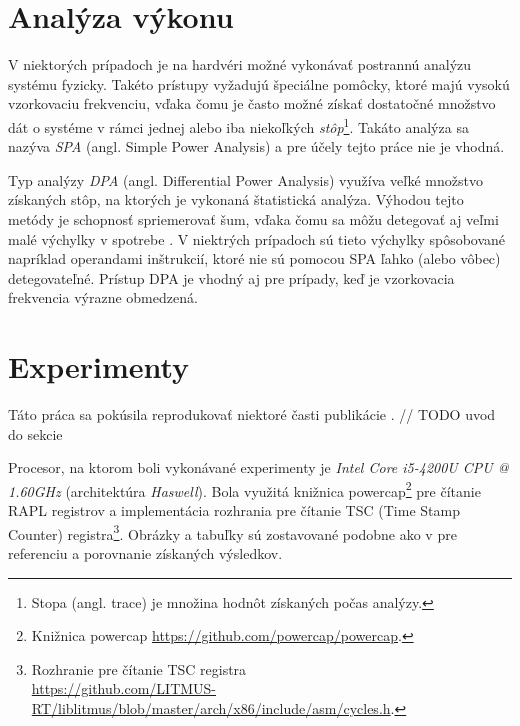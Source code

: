 \section{Analýza výkonu}
V niektorých prípadoch je na hardvéri možné vykonávať postrannú analýzu systému fyzicky. Takéto prístupy vyžadujú špeciálne pomôcky,
ktoré majú vysokú vzorkovaciu frekvenciu, vďaka čomu je často možné získať dostatočné množstvo dát o systéme v rámci jednej alebo
iba niekoľkých \emph{stôp}\footnote{Stopa (angl. trace) je množina hodnôt získaných počas analýzy.}.
Takáto analýza sa nazýva \emph{SPA} (angl. Simple Power Analysis) a pre účely tejto práce nie je vhodná.

Typ analýzy \emph{DPA} (angl. Differential Power Analysis) využíva veľké množstvo získaných stôp, na ktorých je vykonaná štatistická analýza.
Výhodou tejto metódy je schopnosť spriemerovať šum, vďaka čomu sa môžu detegovať aj veľmi malé výchylky v spotrebe \cite{Platypus}. V niektrých prípadoch sú tieto
výchylky spôsobované napríklad operandami inštrukcií, ktoré nie sú pomocou SPA ľahko (alebo vôbec) detegovateľné. Prístup DPA je vhodný aj pre
prípady, keď je vzorkovacia frekvencia výrazne obmedzená.

\section{Experimenty}
Táto práca sa pokúsila reprodukovať niektoré časti publikácie \cite{Platypus}.
// TODO uvod do sekcie

Procesor, na ktorom boli vykonávané experimenty je \emph{Intel Core i5-4200U CPU @ 1.60GHz} (architektúra \emph{Haswell}). Bola využitá knižnica
powercap\footnote{Knižnica powercap \href{https://github.com/powercap/powercap}{https://github.com/powercap/powercap}.} pre čítanie RAPL registrov
a implementácia rozhrania pre čítanie TSC (Time Stamp Counter) registra\footnote{Rozhranie pre čítanie TSC registra\\\href{https://github.com/LITMUS-RT/liblitmus/blob/master/arch/x86/include/asm/cycles.h}{https://github.com/LITMUS-RT/liblitmus/blob/master/arch/x86/include/asm/cycles.h}.}.
Obrázky a tabuľky sú zostavované podobne ako v \cite{Platypus} pre referenciu a porovnanie získaných výsledkov.


